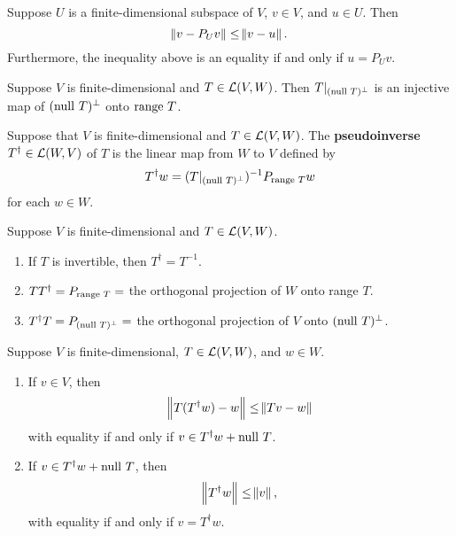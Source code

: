 \documentclass{extarticle}
\begin{document}
\begin{thm}
    Suppose \(U\) is a finite-dimensional subspace of \(V\), \(v \in V\), and \(u \in U\). Then 
    \[\norm{v - P_U v} \leq \norm{v - u}.\]
    Furthermore, the inequality above is an equality if and only if \(u = P_U v\).
\end{thm}

\begin{lemma}
    Suppose \(V\) is finite-dimensional and \(T \in \mathcal{L}(V, W)\). Then \(T |_{(\text{null } T)^\perp}\) is an 
    injective map of \((\text{null } T)^\perp\) onto \(\text{range } T\).
\end{lemma}

\begin{definition}
    Suppose that \(V\) is finite-dimensional and \(T \in \mathcal{L}(V, W)\). The \textbf{pseudoinverse} 
    \(T^\dagger \in \mathcal{L}(W, V)\) of \(T\) is the linear map from \(W\) to \(V\) defined by 
    \[T^\dagger w = (T|_{(\text{null } T)^\perp})^{-1} P_{\text{range } T} w\]
    for each \(w \in W\).
\end{definition}

\begin{corollary}
    Suppose \(V\) is finite-dimensional and \(T \in \mathcal{L}(V, W)\). 
    \begin{enumerate}[label=(\alph*)]
        \item If \(T\) is invertible, then \(T^\dagger = T^{-1}\). 
        \item \(T T^\dagger = P_{\text{range } T} =\) the orthogonal projection of \(W\) onto range \(T\). 
        \item \(T^\dagger T = P_{(\text{null } T)^\perp} = \) the orthogonal projection of \(V\) onto \((\text{null } T)^\perp\).
    \end{enumerate}
\end{corollary}

\begin{thm}
    Suppose \(V\) is finite-dimensional, \(T \in \mathcal{L}(V, W)\), and \(w \in W\). 
    \begin{enumerate}[label=(\alph*)]
        \item If \(v \in V\), then 
        \[\norm{T(T^\dagger w) - w} \leq \norm{Tv - w}\]
        with equality if and only if \(v \in T^\dagger w + \text{null } T\). 

        \item If \(v \in T^\dagger w + \text{null } T\), then 
        \[\norm{T^\dagger w} \leq \norm{v},\]
        with equality if and only if \(v = T^\dagger w\). 
    \end{enumerate}
\end{thm}
\end{document}
